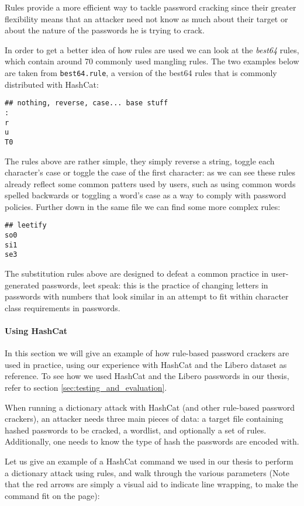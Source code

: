 Rules provide a more efficient way to tackle password cracking since their greater flexibility means that an attacker need not know as much about their target or about the nature of the passwords he is trying to crack. 

In order to get a better idea of how rules are used we can look at the \emph{best64} rules, which contain around 70 commonly used mangling rules. The two examples below are taken from \texttt{best64.rule}, a version of the best64 rules that is commonly distributed with HashCat:
\begin{verbatim}
## nothing, reverse, case... base stuff
:
r
u
T0
\end{verbatim}

The rules above are rather simple, they simply reverse a string, toggle each character's case or toggle the case of the first character: as we can see these rules already reflect some common patters used by users, such as using common words spelled backwards or toggling a word's case as a way to comply with password policies.
Further down in the same file we can find some more complex rules:
\begin{verbatim}
## leetify
so0
si1
se3
\end{verbatim}

The substitution rules above are designed to defeat a common practice in user-generated passwords, leet speak: this is the practice of changing letters in passwords with numbers that look similar in an attempt to fit within character class requirements in passwords. 

\paragraph{Using HashCat}
In this section we will give an example of how rule-based password crackers are used in practice, using our experience with HashCat and the Libero dataset as reference. To see how we used HashCat and the Libero passwords in our thesis, refer to section \ref{sec:testing_and_evaluation}.

When running a dictionary attack with HashCat (and other rule-based password crackers), an attacker needs three main pieces of data: a target file containing hashed passwords to be cracked, a wordlist, and optionally a set of rules.
Additionally, one needs to know the type of hash the passwords are encoded with.

Let us give an example of a HashCat command we used in our thesis to perform a dictionary attack using rules, and walk through the various parameters (Note that the red arrows are simply a visual aid to indicate line wrapping, to make the command fit on the page):

